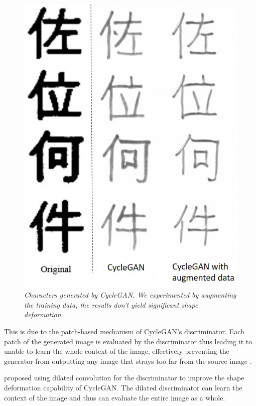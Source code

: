 \documentclass[12pt]{report}
\begin{document}
\begin{figure}[H]
	\centering
	\includegraphics[scale=0.7]{kanji-example}
	\caption{\textit{Characters generated by CycleGAN. We experimented by augmenting the training data, the results don't yield significant shape deformation.}}
	\label{fig:kanji-example}
\end{figure}


This is due to the patch-based mechanism of CycleGAN's discriminator. Each patch of the generated image is evaluated by the discriminator thus leading it to unable to learn the whole context of the image, effectively preventing the generator from outputting any image that strays too far from the source image \cite{ganimorph}.

\cite{ganimorph} proposed using dilated convolution for the discriminator to improve the shape deformation capability of CycleGAN. The dilated discriminator can learn the context of the image and thus can evaluate the entire image as a whole.
\end{document}

